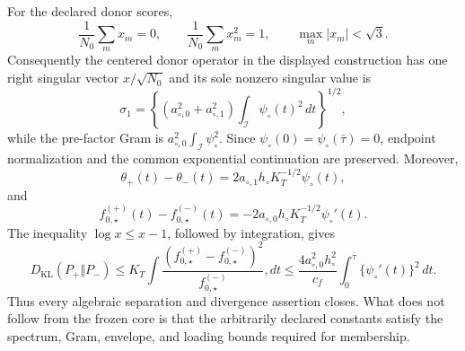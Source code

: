 For the declared donor scores,
\[
 \frac1{N_0}\sum_m x_m=0,
 \qquad
 \frac1{N_0}\sum_m x_m^2=1,
 \qquad
 \max_m|x_m|<\sqrt3.
\]
Consequently the centered donor operator in the displayed construction has one right singular vector \(x/\sqrt{N_0}\) and its sole nonzero singular value is
\[
 \sigma_1=\left\{(a_{\circ,0}^2+a_{\circ,1}^2)
 \int_{\mathcal I}\psi_\circ(t)^2\,dt\right\}^{1/2},
\]
while the pre-factor Gram is \(a_{\circ,0}^2\int_{\mathcal I}\psi_\circ^2\).  Since \(\psi_\circ(0)=\psi_\circ(\bar\tau)=0\), endpoint normalization and the common exponential continuation are preserved.  Moreover,
\[
 \theta_+(t)-\theta_-(t)
 =2a_{\circ,1}h_\circ K_T^{-1/2}\psi_\circ(t),
\]
and
\[
 f_{0,\star}^{(+)}(t)-f_{0,\star}^{(-)}(t)
 =-2a_{\circ,0}h_\circ K_T^{-1/2}\psi_\circ'(t).
\]
The inequality \(\log x\le x-1\), followed by integration, gives
\[
 D_{\mathrm{KL}}(P_+\Vert P_-)
 \le K_T\int\frac{(f_{0,\star}^{(+)}-f_{0,\star}^{(-)})^2}
 {f_{0,\star}^{(-)}},dt
 \le\frac{4a_{\circ,0}^2h_\circ^2}{c_f}
 \int_0^{\bar\tau}\{\psi_\circ'(t)\}^2\,dt.
\]
Thus every algebraic separation and divergence assertion closes.  What does not follow from the frozen core is that the arbitrarily declared constants satisfy the spectrum, Gram, envelope, and loading bounds required for membership.